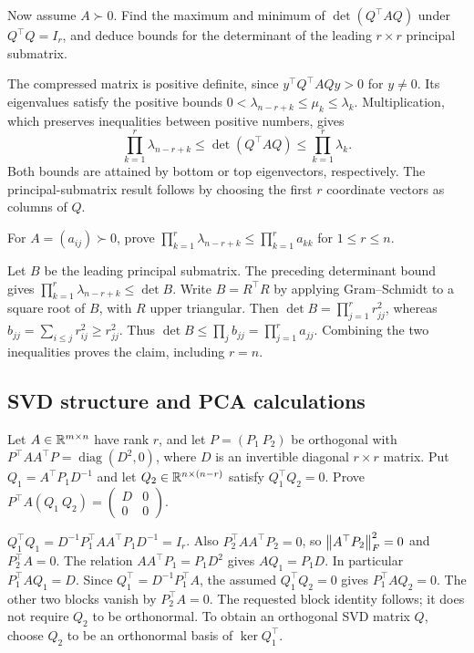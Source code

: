 \begin{problem}
Now assume $A\succ0$. Find the maximum and minimum of
$\det(Q^\top AQ)$ under $Q^\top Q=I_r$, and deduce bounds for the
determinant of the leading $r\times r$ principal submatrix.
\end{problem}
\begin{solution}
The compressed matrix is positive definite, since
$y^\top Q^\top AQy>0$ for $y\ne0$.
Its eigenvalues satisfy the positive bounds
$0<\lambda_{n-r+k}\leqslant\mu_k\leqslant\lambda_k$.
Multiplication, which preserves inequalities between positive numbers,
gives
\[
\prod_{k=1}^r\lambda_{n-r+k}\leqslant\det(Q^\top AQ)
\leqslant\prod_{k=1}^r\lambda_k.
\]
Both bounds are attained by bottom or top eigenvectors, respectively.
The principal-submatrix result follows by choosing the first $r$
coordinate vectors as columns of $Q$.
\end{solution}

\begin{problem}
For $A=(a_{ij})\succ0$, prove
$\prod_{k=1}^r\lambda_{n-r+k}\leqslant\prod_{k=1}^r a_{kk}$
for $1\leqslant r\leqslant n$.
\end{problem}
\begin{solution}
Let $B$ be the leading principal submatrix. The preceding determinant
bound gives $\prod_{k=1}^r\lambda_{n-r+k}\leqslant\det B$.
Write $B=R^\top R$ by applying Gram--Schmidt to a square root of $B$,
with $R$ upper triangular. Then
$\det B=\prod_{j=1}^r r_{jj}^2$, whereas
$b_{jj}=\sum_{i\leqslant j}r_{ij}^2\geqslant r_{jj}^2$.
Thus $\det B\leqslant\prod_j b_{jj}=\prod_{j=1}^r a_{jj}$.
Combining the two inequalities proves the claim, including $r=n$.
\end{solution}

\subsection*{SVD structure and PCA calculations}
\begin{problem}
Let $A\in\mathbb R^{m\times n}$ have rank $r$, and let $P=(P_1\ P_2)$ be
orthogonal with
$P^\top AA^\top P=\operatorname{diag}(D^2,0)$, where $D$ is an
invertible diagonal $r\times r$ matrix. Put $Q_1=A^\top P_1D^{-1}$
and let $Q_2\in\mathbb R^{n\times(n-r)}$ satisfy $Q_1^\top Q_2=0$.
Prove $P^\top A(Q_1\ Q_2)=\begin{pmatrix}D&0\\0&0\end{pmatrix}$.
\end{problem}
\begin{solution}
$Q_1^\top Q_1=D^{-1}P_1^\top AA^\top P_1D^{-1}=I_r$.
Also $P_2^\top AA^\top P_2=0$, so
$\left\lVert A^\top P_2\right\rVert_F^2=0$ and $P_2^\top A=0$.
The relation $AA^\top P_1=P_1D^2$ gives
$AQ_1=P_1D$. In particular $P_1^\top AQ_1=D$.
Since $Q_1^\top=D^{-1}P_1^\top A$, the assumed
$Q_1^\top Q_2=0$ gives $P_1^\top AQ_2=0$.
The other two blocks vanish by $P_2^\top A=0$.
The requested block identity follows; it does not require $Q_2$ to
be orthonormal. To obtain an orthogonal SVD matrix $Q$, choose $Q_2$
to be an orthonormal basis of $\ker Q_1^\top$.
\end{solution}

